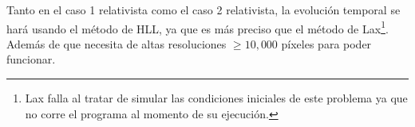 \documentclass[12pt,a4paper]{book}
\begin{document}
Tanto en el caso 1 relativista como el caso 2 relativista, la evolución temporal se hará usando 
el método de HLL, ya que es más preciso que el método de Lax\footnote{
  Lax falla al tratar de simular las condiciones iniciales de este problema ya que no corre el programa al momento de su ejecución.
}. 
Además de que necesita de altas resoluciones $\geq 10,000$ píxeles para poder funcionar.

\begin{figure}
  \centering

\end{figure}
\end{document}
